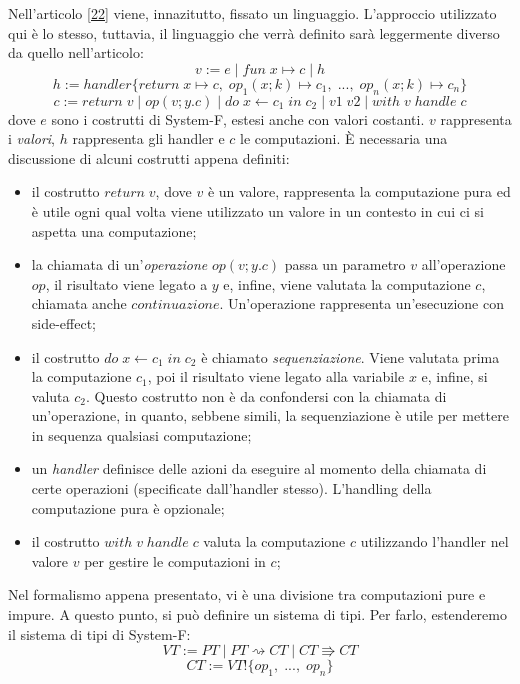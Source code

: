 \documentclass[10pt,a4paper]{article}
\begin{document}
Nell'articolo \hyperlink{bibl22}{[22]} viene, innazitutto, fissato un linguaggio. L'approccio utilizzato qui è lo stesso,
tuttavia, il linguaggio che verrà definito sarà leggermente diverso da quello nell'articolo:
\[ v := e \; | \; fun \; x \mapsto c \; | \; h \]
\[ h := handler \{ return \; x \mapsto c, \; op_1(x;k) \mapsto c_1, \; ..., \; op_n(x;k) \mapsto c_n \} \]
\[ c := return \; v \; | \; op(v;y.c) \; | \; do \; x \leftarrow c_1 \; in \; c_2 \; | \; v1 \; v2 \; | \; with \; v \; handle \; c \]
dove $ e $ sono i costrutti di System-F, estesi anche con valori costanti. $ v $ rappresenta i \textit{valori},
$ h $ rappresenta gli handler e $ c $ le computazioni.
\`E necessaria una discussione di alcuni costrutti appena definiti:
\begin{itemize}
    \item il costrutto $ return \; v $, dove $ v $ è un valore, rappresenta la computazione pura ed è utile ogni qual
    volta viene utilizzato un valore in un contesto in cui ci si aspetta una computazione;
    \item la chiamata di un'\textit{operazione} $ op(v;y.c) $ passa un parametro $ v $ all'operazione $ op $, il
    risultato viene legato a $ y $ e, infine, viene valutata la computazione $ c $, chiamata anche $ continuazione $.
    Un'operazione rappresenta un'esecuzione con side-effect;
    \item il costrutto $ do \; x \leftarrow c_1 \; in \; c_2 $ è chiamato \textit{sequenziazione}. Viene valutata
    prima la computazione $ c_1 $, poi il risultato viene legato alla variabile $ x $ e, infine, si valuta $ c_2 $.
    Questo costrutto non è da confondersi con la chiamata di un'operazione, in quanto, sebbene simili, la sequenziazione
    è utile per mettere in sequenza qualsiasi computazione;
    \item un \textit{handler} definisce delle azioni da eseguire al momento della chiamata di certe operazioni
    (specificate dall'handler stesso). L'handling della computazione pura è opzionale;
    \item il costrutto $ with \; v \; handle \; c $ valuta la computazione $ c $ utilizzando l'handler nel valore
    $ v $ per gestire le computazioni in $ c $;
\end{itemize}
Nel formalismo appena presentato, vi è una divisione tra computazioni pure e impure. A questo punto, si può definire
un sistema di tipi. Per farlo, estenderemo il sistema di tipi di System-F:
\[ VT := PT \; | \; PT \rightsquigarrow CT \; | \; CT \Rrightarrow CT \]
\[ CT := VT ! \{ op_1, \; ..., \; op_n \} \]
\end{document}
